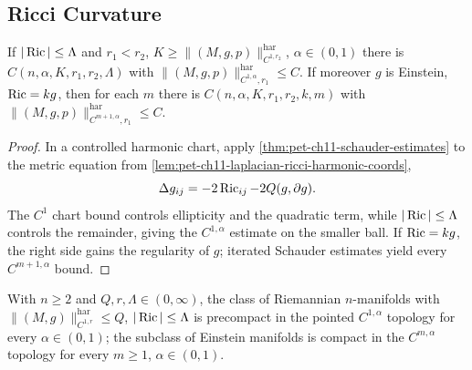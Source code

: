 \subsection{Ricci Curvature}

\begin{lemma}
  \label{lem:pet-ch11-anderson-ricci-harmonic-c1alpha-bound}
  If $|\operatorname{Ric}|\le\Lambda$ and $r_1<r_2$,
  $K\ge\|(M,g,p)\|^{\mathrm{har}}_{C^{1,r_2}}$, $\alpha\in(0,1)$ there is
  $C(n,\alpha,K,r_1,r_2,\Lambda)$ with
  $\|(M,g,p)\|^{\mathrm{har}}_{C^{1,\alpha},r_1}\le C$. If moreover $g$ is
  Einstein, $\operatorname{Ric}=kg$, then for each $m$ there is
  $C(n,\alpha,K,r_1,r_2,k,m)$ with
  $\|(M,g,p)\|^{\mathrm{har}}_{C^{m+1,\alpha},r_1}\le C$.
\end{lemma}
\begin{proof}
  \sketch
  In a controlled harmonic chart, apply \cref{thm:pet-ch11-schauder-estimates} to the metric equation from \cref{lem:pet-ch11-laplacian-ricci-harmonic-coords},
  \[
    \Delta g_{ij}=-2\operatorname{Ric}_{ij}-2Q(g,\partial g).
  \]
  The \(C^1\) chart bound controls ellipticity and the quadratic term, while \(|\operatorname{Ric}|\le\Lambda\) controls the remainder, giving the \(C^{1,\alpha}\) estimate on the smaller ball. If \(\operatorname{Ric}=kg\), the right side gains the regularity of \(g\); iterated Schauder estimates yield every \(C^{m+1,\alpha}\) bound.
\end{proof}


\begin{corollary}
  \label{cor:pet-ch11-ricci-bounded-precompact-c1alpha}
  With $n\ge2$ and $Q,r,\Lambda\in(0,\infty)$, the class of Riemannian
  $n$-manifolds with $\|(M,g)\|^{\mathrm{har}}_{C^{1,r}}\le Q$,
  $|\operatorname{Ric}|\le\Lambda$ is precompact in the pointed $C^{1,\alpha}$ topology for
  every $\alpha\in(0,1)$; the subclass of Einstein manifolds is compact in
  the $C^{m,\alpha}$ topology for every $m\ge1$, $\alpha\in(0,1)$.
\end{corollary}

